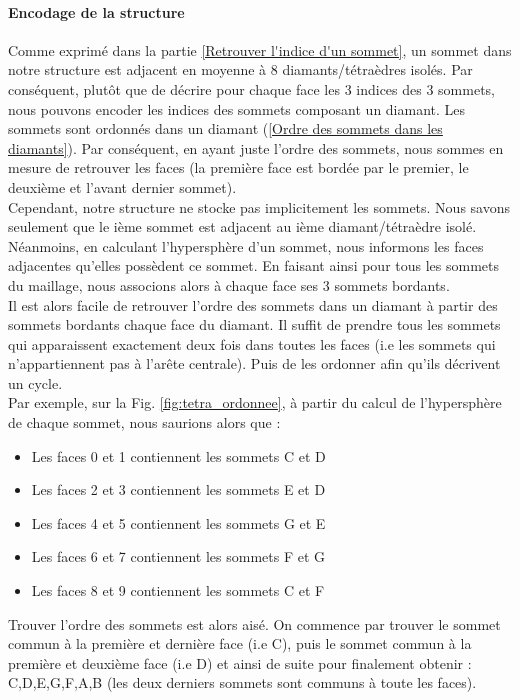 \documentclass[a4paper,11pt,openany]{article}
\begin{document}
\paragraph{Encodage de la structure}
Comme exprimé dans la partie \ref{Retrouver l'indice d'un sommet}, un sommet dans notre structure est adjacent en moyenne à 8 diamants/tétraèdres isolés. Par conséquent, plutôt que de décrire pour chaque face les 3 indices des 3 sommets, nous pouvons encoder les indices des sommets composant un diamant. Les sommets sont ordonnés dans un diamant (\ref{Ordre des sommets dans les diamants}). Par conséquent, en ayant juste l'ordre des sommets, nous sommes en mesure de retrouver les faces (la première face est bordée par le premier, le deuxième et l'avant dernier sommet).\\
Cependant, notre structure ne stocke pas implicitement les sommets. Nous savons seulement que le ième sommet est adjacent au ième diamant/tétraèdre isolé. Néanmoins, en calculant l'hypersphère d'un sommet, nous informons les faces adjacentes qu'elles possèdent ce sommet. En faisant ainsi pour tous les sommets du maillage, nous associons alors à chaque face ses 3 sommets bordants.\\
Il est alors facile de retrouver l'ordre des sommets dans un diamant à partir des sommets bordants chaque face du diamant. Il suffit de prendre tous les sommets qui apparaissent exactement deux fois dans toutes les faces (i.e les sommets qui n'appartiennent pas à l'arête centrale). Puis de les ordonner afin qu'ils décrivent un cycle.\\
Par exemple, sur la Fig. \ref{fig:tetra_ordonnee}, à partir du calcul de l'hypersphère de chaque sommet, nous saurions alors que :
\begin{itemize}
\item Les faces 0 et 1 contiennent les sommets C et D
\item Les faces 2 et 3 contiennent les sommets E et D
\item Les faces 4 et 5 contiennent les sommets G et E
\item Les faces 6 et 7 contiennent les sommets F et G
\item Les faces 8 et 9 contiennent les sommets C et F
\end{itemize}
Trouver l'ordre des sommets est alors aisé. On commence par trouver le sommet commun à la première et dernière face (i.e C), puis le sommet commun à la première et deuxième face (i.e D) et ainsi de suite pour finalement obtenir : C,D,E,G,F,A,B (les deux derniers sommets sont communs à toute les faces).
\end{document}
